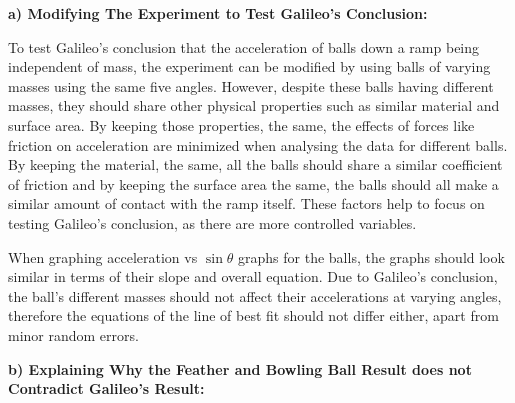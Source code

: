 \documentclass[12pt,letterpaper]{article}
\newcommand\tab[1][1cm]{\hspace*{#1}}
\begin{document}
\noindent
\tab \textbf{a) Modifying The Experiment to Test Galileo's Conclusion:}

\noindent
\begin{flushleft}
	\tab To test Galileo’s conclusion that the acceleration of balls down a ramp being \tab independent of mass, the experiment can be modified by using balls of varying masses \tab using the same five angles. However, despite these balls having different masses, they \tab should share other physical properties such as similar material and surface area. By \tab keeping those properties, the same, the effects of forces like friction on acceleration \tab are minimized when analysing the data for different balls. By keeping the \tab material, the same, all the balls should share a similar coefficient of friction and by \tab keeping the surface area the same, the balls should all make a similar amount of \tab contact with the ramp itself. These factors help to focus on testing Galileo’s \tab conclusion, as there are more controlled variables.

	\vspace{4mm}
	\tab When graphing acceleration vs $\sin\theta$ graphs for the balls, the graphs should look \tab similar in terms of their slope and overall equation. Due to Galileo’s conclusion, the \tab ball’s different masses should not affect their accelerations at varying angles, therefore \tab the equations of the line of best fit should not differ either, apart from minor random \tab errors.

\end{flushleft}


\noindent
\tab \textbf{b) Explaining Why the Feather and Bowling Ball Result does not Contradict \tab Galileo's Result:}
\end{document}
